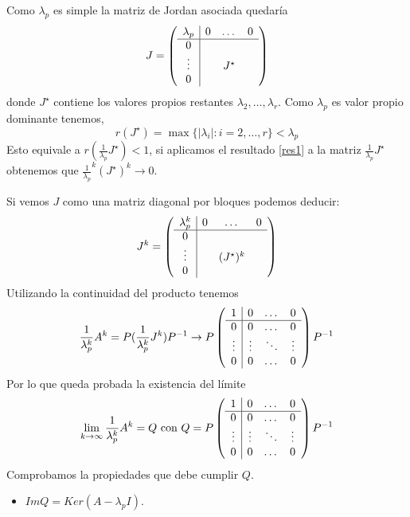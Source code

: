 \documentclass[size=a4, parskip=half, titlepage=false, toc=flat, toc=bib, 12pt]{scrartcl}
\makeatletter
\renewenvironment{proof}[1][\proofname] {\par\pushQED{\qed}\normalfont\topsep6\p@\@plus6\p@\relax\trivlist\item[\hskip\labelsep\itshape\tgpaella#1\@addpunct{.}]\ignorespaces}{\popQED\endtrivlist\@endpefalse}
\theoremstyle{theorem-style}
\theoremstyle{definition-style}
\theoremstyle{remark-style}
\theoremstyle{example-style}
\theoremstyle{definition-style}
\theoremstyle{remark-style}
\renewcommand{\proofname}{\normalfont\tgpaella\bfseries\small DEMOSTRACIÓN}
\makeatother
\begin{document}
\begin{proof}
Como $\lambda_p$ es simple la matriz de Jordan asociada quedaría $$
  J =
    \left(
      \begin{array}{{c|ccc}}
        \lambda_p     &    0      &   \dots    & 0\\\hline
            0         &           &        &  \\
            \vdots    &           & J^{\star} &  \\
           0          &           &        &
      \end{array}
    \right)
$$ donde $J^{\star}$ contiene los valores propios restantes $\lambda_2, \dots, \lambda_r$.
Como $\lambda_p$ es valor propio dominante tenemos,
$$r(J^{\star}) = \max \{ |\lambda_i| : i = 2, \dots , r \} < \lambda_p $$
Esto equivale a $r(\frac{1}{\lambda_p} J^{\star}) < 1$, si aplicamos el resultado \ref{res1} a la matriz $\frac{1}{\lambda_p} J^{\star}$ obtenemos que $\frac{1}{\lambda_p}^k (J^{\star})^k \rightarrow 0$.

Si vemos $J$ como una matriz diagonal por bloques podemos deducir:
$$J^k =      \left(
      \begin{array}{{c|ccc}}
        \lambda_p^k     &    0      &   \dots    & 0\\\hline
            0         &           &        &  \\
            \vdots    &           & (J^{\star})^k &  \\
           0          &           &        &
      \end{array}
    \right)$$
Utilizando la continuidad del producto tenemos
$$\frac{1}{\lambda_p^k} A^k = P (\frac{1}{\lambda_p^k}  J^k)P^{-1} \rightarrow P \left(
      \begin{array}{{c|ccc}}
            1         &    0      &   \dots    & 0\\\hline
            0         &    0       &    \dots    & 0 \\
            \vdots    &    \vdots  &  \ddots &  \vdots \\
           0          &     0       &    \dots    & 0
      \end{array}   \right) P^{-1}$$
Por lo que queda probada la existencia del límite
$$\lim_{k \to \infty} \frac{1}{\lambda_p^k} A^k  = Q \  \textrm{con} \ Q = P \left(
      \begin{array}{{c|ccc}}
            1         &    0      &   \dots    & 0\\\hline
            0         &    0       &    \dots    & 0 \\
            \vdots    &    \vdots  &  \ddots &  \vdots \\
           0          &     0       &    \dots    & 0
      \end{array}   \right) P^{-1} $$
Comprobamos la propiedades que debe cumplir $Q$.
\begin{itemize}
\item $Im Q = Ker (A - \lambda_p I)$.


\end{itemize}
\end{proof}
\end{document}
